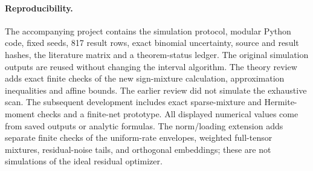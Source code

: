 \documentclass[11pt]{article}
\theoremstyle{remark}
\begin{document}
\paragraph{Reproducibility.}
The accompanying project contains the simulation protocol, modular Python code, fixed seeds, 817 result rows, exact binomial uncertainty, source and result hashes, the literature matrix and a theorem-status ledger. The original simulation outputs are reused without changing the interval algorithm. The theory review adds exact finite checks of the new sign-mixture calculation, approximation inequalities and affine bounds. The earlier review did not simulate the exhaustive scan. The subsequent development includes exact sparse-mixture and Hermite-moment checks and a finite-net prototype. All displayed numerical values come from saved outputs or analytic formulas. The norm/loading extension adds separate finite checks of the uniform-rate envelopes, weighted full-tensor mixtures, residual-noise tails, and orthogonal embeddings; these are not simulations of the ideal residual optimizer.

\appendix









\end{document}
